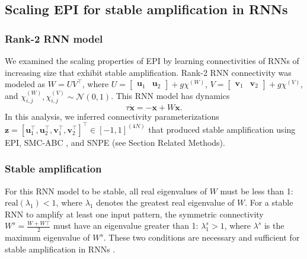 \documentclass[11pt]{article}
\begin{document}
\subsection{Scaling EPI for stable amplification in RNNs}\label{methods_RNN}
\subsubsection{Rank-2 RNN model}
We examined the scaling properties of EPI by learning connectivities of RNNs of increasing size that exhibit stable amplification.
Rank-2 RNN connectivity was modeled as $W = UV^\top$, where $U = \begin{bmatrix} \mathbf{u}_1 & \mathbf{u}_2 \end{bmatrix} + g \chi^{(W)}$, $V = \begin{bmatrix} \mathbf{v}_1 & \mathbf{v}_2 \end{bmatrix} + g\chi^{(V)}$, and $\chi^{(W)}_{i,j}, \chi^{(V)}_{i,j} \sim \mathcal{N}(0, 1)$.
This RNN model has dynamics
\begin{equation}
\tau \dot{\mathbf{x}} = -\mathbf{x} + W\mathbf{x}.
\end{equation}
In this analysis, we inferred connectivity parameterizations $\mathbf{z} = \left[\mathbf{u}_1^\top, \mathbf{u}_2^\top, \mathbf{v}_1^\top, \mathbf{v}_2^\top \right]^\top \in \left[-1, 1 \right]^{(4N)}$   that produced stable amplification using EPI, SMC-ABC \cite{sisson2007sequential}, and SNPE \cite{gonccalves2019training} (see Section Related Methods).

\subsubsection{Stable amplification}
For this RNN model to be stable, all real eigenvalues of $W$ must be less than 1:  $\text{real}(\lambda_1) < 1$, where $\lambda_1$ denotes the greatest real eigenvalue of $W$.
For a stable RNN to amplify at least one input pattern, the symmetric connectivity $W^s = \frac{W + W\top}{2}$ must have an eigenvalue greater than 1:
$\lambda^s_1 > 1$, where  $\lambda^s$ is the maximum eigenvalue of $W^s$.
These two conditions are necessary and sufficient for stable amplification in RNNs \cite{bondanelli2020coding}.
\end{document}
